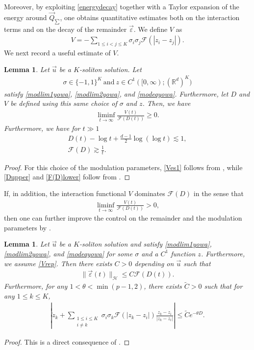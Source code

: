 \documentclass[reqno]{amsart}
\theoremstyle{plain}
\newtheorem{lemma}[theorem]{Lemma}
\theoremstyle{definition}
\numberwithin{equation}{section}
\begin{document}
Moreover, by exploiting \eqref{energydecay} together with a Taylor expansion of the
energy around $\vec{Q}_{\sum}$, one obtains quantitative estimates both on the interaction terms and on the decay of the
remainder $\vec{\varepsilon}$. We define $V$ as 
\begin{align}\label{Vdef}
V=-\sum_{1\leq i<j\leq K}\sigma_i\sigma_j\mathcal{F}(|z_i-z_j|).
\end{align}
We next record a useful estimate of $V$.

\begin{lemma}\label{limeplem}
Let $\vec{u}$ be a $K$-soliton solution. Let 
\begin{align*}
\sigma\in\{-1,1\}^K\  \mbox{and}\  z\in C^1([0,\infty);(\mathbb{R}^d)^K)
\end{align*}
satisfy \eqref{modlim1yowa}, \eqref{modlim2yowa}, and \eqref{modeqyowa}. Furthermore, let $D$ and $V$ be defined using this same
choice of $\sigma$ and $z$. Then, we have
\begin{align}\label{Ves1}
\liminf_{t\to\infty} \frac{V(t)}{\mathcal{F}(D(t))}\geq 0.
\end{align}
Furthermore, we have for $t\gg 1$
\begin{align}
D(t)-\log{t}+\frac{d-1}{2}\log{(\log{t})}\lesssim1, \label{Dupper}
\\
\mathcal{F}(D)\gtrsim \frac{1}{t}. \label{F(D)lower}
\end{align}
\end{lemma}
\begin{proof}
For this choice of the modulation parameters, \eqref{Ves1} follows from \cite[Lemma 3.8]{I2}, while \eqref{Dupper} and \eqref{F(D)lower} follow from \cite[Lemma 3.9]{I2}.
\end{proof}
If, in addition, the interaction functional $V$ dominates $\mathcal{F}(D)$ in the sense that
\begin{align}\label{Vrep}
\liminf_{t\to \infty}\frac{V(t)}{\mathcal{F}(D(t))}> 0,
\end{align}
then one can further improve the control on the remainder and the modulation parameters by \cite[Lemma 3.11]{I2}.
\begin{lemma}\label{epzes}
Let $\vec{u}$ be a $K$-soliton solution and satisfy \eqref{modlim1yowa}, \eqref{modlim2yowa}, and \eqref{modeqyowa} for some $\sigma$ and a $C^1$ function $z$. Furthermore, we assume \eqref{Vrep}. Then there exists $C>0$ depending on $\vec{u}$ such that
\begin{align}\label{newepes}
\|\vec{\varepsilon}(t)\|_{\mathcal{H}}\leq C \mathcal{F}(D(t)).
\end{align}
Furthermore, for any $1<\theta<\min{(p-1,2)}$, there exists $\tilde{C}>0$ such that for any $1\leq k\leq K$,
\begin{align}\label{newzes}
\left|\dot{z}_k+\sum_{\substack{1\leq i\leq K\\ i\neq k}}\sigma_i\sigma_k\mathcal{F}(|z_k-z_i|)
\frac{z_k-z_i}{|z_k-z_i|}\right|
\leq \tilde{C} e^{-\theta D}.
\end{align}
\end{lemma}
\begin{proof}
This is a direct consequence of \cite[Lemma 3.11]{I2}.
\end{proof}
\end{document}
